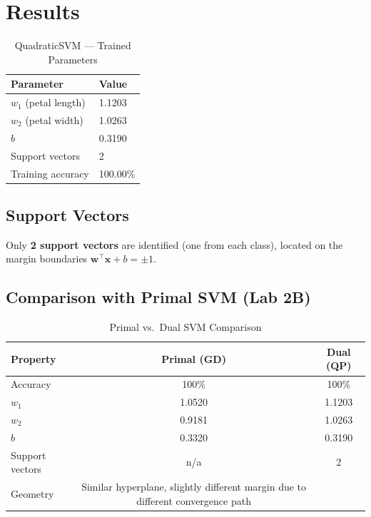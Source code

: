 \documentclass[12pt,a4paper]{article}
\begin{document}
\section{Results}

\begin{table}[H]
\centering
\caption{QuadraticSVM — Trained Parameters}
\begin{tabular}{ll}
\toprule
\textbf{Parameter} & \textbf{Value} \\ \midrule
$w_1$ (petal length) & 1.1203 \\
$w_2$ (petal width)  & 1.0263 \\
$b$                  & 0.3190 \\
Support vectors      & 2 \\
Training accuracy    & 100.00\% \\
\bottomrule
\end{tabular}
\end{table}

\subsection{Support Vectors}

Only \textbf{2 support vectors} are identified (one from each class), located on the margin boundaries $\mathbf{w}^\top\mathbf{x} + b = \pm 1$.

\subsection{Comparison with Primal SVM (Lab 2B)}

\begin{table}[H]
\centering
\caption{Primal vs.\ Dual SVM Comparison}
\begin{tabular}{lcc}
\toprule
\textbf{Property} & \textbf{Primal (GD)} & \textbf{Dual (QP)} \\ \midrule
Accuracy       & 100\%   & 100\%   \\
$w_1$          & 1.0520  & 1.1203  \\
$w_2$          & 0.9181  & 1.0263  \\
$b$            & 0.3320  & 0.3190  \\
Support vectors & n/a    & 2       \\
Geometry       & Similar hyperplane, slightly different margin due to different convergence path \\
\bottomrule
\end{tabular}
\end{table}
\end{document}

